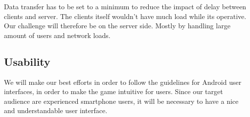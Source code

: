 Data transfer has to be set to a minimum to reduce the impact of delay between clients and server. The clients itself wouldn't have much load while its operative. Our challenge will therefore be on the server side. Mostly by handling large amount of users and network loads. 




\subsection{Usability} 
We will make our best efforts in order to follow the guidelines for Android user interfaces, in order to make the game intuitive for users. Since our target audience are experienced smartphone users, it will be necessary to have a nice and understandable user interface. 